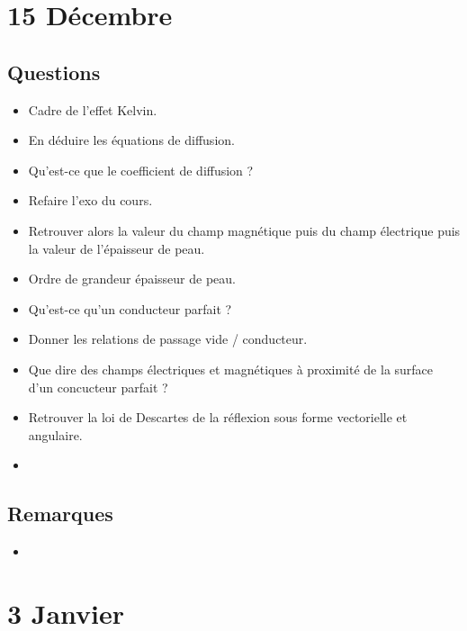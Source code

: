 \documentclass[a4paper, 11pt, hidelinks]{article}
\begin{document}
\section{15 Décembre}

\subsection{Questions}



\begin{itemize}
    \item Cadre de l'effet Kelvin. \cite{Chapitre17}
    \item En déduire les équations de diffusion. \cite{Chapitre17}
    \item Qu'est-ce que le coefficient de diffusion ? \cite{Chapitre17}
    \item Refaire l'exo du cours. \cite{Chapitre17}
    \item Retrouver alors la valeur du champ magnétique puis du champ électrique puis la valeur de l'épaisseur de peau. \cite{Chapitre17}
    \item Ordre de grandeur épaisseur de peau. \cite{Chapitre17}
    \item Qu'est-ce qu'un conducteur parfait ? \cite{Chapitre17}
    \item Donner les relations de passage vide / conducteur. \cite{Chapitre17}
    \item Que dire des champs électriques et magnétiques à proximité de la surface d'un concucteur parfait ? \cite{Chapitre17}
    \item Retrouver la loi de Descartes de la réflexion sous forme vectorielle et angulaire. \cite{Chapitre17}
    \item 
\end{itemize}


\subsection{Remarques}

\begin{itemize}
    \item 
\end{itemize}



\section{3 Janvier}
\end{document}

